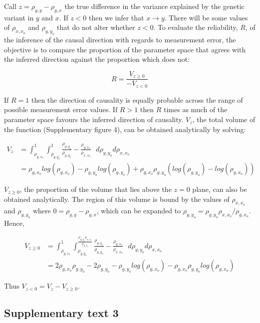 \documentclass[]{article}
\begin{document}
Call \(z = \rho_{g,y} - \rho_{g,x}\) the true difference in the variance
explained by the genetic variant in \(y\) and \(x\). If \(z < 0\) then
we infer that \(x \rightarrow y\). There will be some values of
\(\rho_{x,x_o}\) and \(\rho_{y,y_o}\) that do not alter whether
\(z < 0\). To evaluate the reliability, \(R\), of the inference of the
causal direction with regards to measurement error, the objective is to
compare the proportion of the parameter space that agrees with the
inferred direction against the proportion which does not:

\[
R = \frac{V_{z \geq 0}}{ - V_{z < 0} }
\]

If \(R=1\) then the direction of causality is equally probable across
the range of possible measurement error values. If \(R > 1\) then \(R\)
times as much of the parameter space favours the inferred direction of
causality. \(V_{z}\), the total volume of the function (Supplementary
figure 4), can be obtained analytically by solving:

\[
\begin{aligned}
V_z & = \int^1_{\rho_{g,x_o}} \int^1_{\rho_{g,y_o}} \frac{\rho_{g,y_o}}{\rho_{y,y_o}} - \frac{\rho_{g,x_o}}{\rho_{x,x_o}}\,\,\,\, d\rho_{y,y_o}d\rho_{x,x_o} \\
& = \rho_{g,x_o}log(\rho_{g,x_o}) - \rho_{g,y_o}log(\rho_{g,y_o}) + \rho_{g,x_o}\rho_{g,y_o}(log(\rho_{g,y_o})-log(\rho_{g,x_o}))
\end{aligned}
\]

\(V_{z \ge 0}\), the proportion of the volume that lies above the
\(z=0\) plane, can also be obtained analytically. The region of this
volume is bound by the values of \(\rho_{x,x_o}\) and \(\rho_{y,y_o}\)
where \(0 = \rho_{g,y} - \rho_{g,x}\), which can be expanded to
\(\rho_{y,y_o} = \rho_{g,y_o}\rho_{x,x_o} / \rho_{g,x_o}\). Hence,

\[
\begin{aligned}
V_{z \ge 0} & = \int^1_{\rho_{g,x_o}} \int^{\frac{\rho_{g,y_o}\rho_{x,x_o}}{\rho_{g,x_o}}}_{\rho_{g,y_o}} \frac{\rho_{g,y_o}}{\rho_{y,y_o}} - \frac{\rho_{g,x_o}}{\rho_{x,x_o}}\,\,\,\, d\rho_{y,y_o}d\rho_{x,x_o} \\
& = 2\rho_{g,x_o}\rho_{g,y_o} - 2\rho_{g,y_o} - \rho_{g,y_o}log(\rho_{g,x_o}) - \rho_{g,x_o}\rho_{g,y_o}log(\rho_{g,x_o})
\end{aligned}
\]

Thus \(V_{z < 0} = V_{z} - V_{z \geq 0}\).

\newpage

\subsection{Supplementary text 3}\label{supplementary-text-3}
\end{document}
